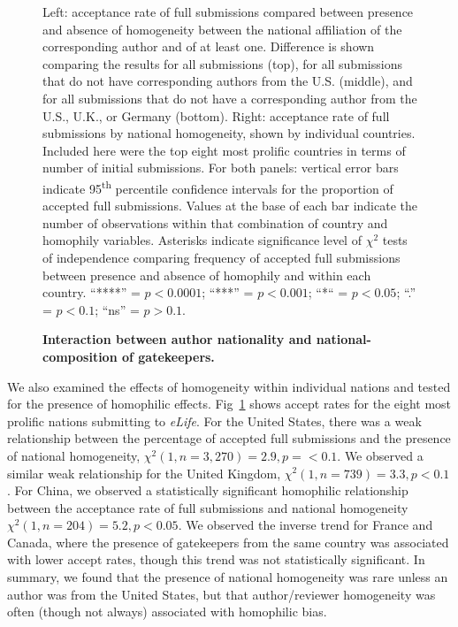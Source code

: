 \documentclass[10pt,letterpaper]{article}
\begin{document}
\begin{figure}[!h]
\caption{\bf Interaction between author nationality and national-composition of gatekeepers.}
Left: acceptance rate of full submissions compared between presence and absence of homogeneity between the national affiliation of the corresponding author and of at least one. Difference is shown comparing the results for all submissions (top), for all submissions that do not have corresponding authors from the U.S. (middle), and for all submissions that do not have a corresponding author from the U.S., U.K., or Germany (bottom). Right: acceptance rate of full submissions by national homogeneity, shown by individual countries. Included here were the top eight most prolific countries in terms of number of initial submissions. For both panels: vertical error bars indicate 95\textsuperscript{th} percentile confidence intervals for the proportion of accepted full submissions. Values at the base of each bar indicate the number of observations within that combination of country and homophily variables. Asterisks indicate significance level of $\chi^{2}$ tests of independence comparing frequency of accepted full submissions between presence and absence of homophily and within each country. “****” = $p < 0.0001$; “***” = $p < 0.001$; “*“ = $p < 0.05$; “.” = $p < 0.1$; “ns” = $p > 0.1$.
\label{fig7}
\end{figure}

We also examined the effects of homogeneity within individual nations and tested for the presence of homophilic effects. Fig~\ref{fig7} shows accept rates for the eight most prolific nations submitting to \textit{eLife}. For the United States, there was a weak relationship between the percentage of accepted full submissions and the presence of national homogeneity, $\chi^{2} (1, n = 3,270) = 2.9, p = < 0.1$. We observed a similar weak relationship for the United Kingdom, $\chi^{2} (1, n = 739) = 3.3, p < 0.1$. For China, we observed a statistically significant homophilic relationship between the acceptance rate of full submissions and national homogeneity $\chi^{2} (1, n = 204) = 5.2, p < 0.05$. We observed the inverse trend for France and Canada, where the presence of gatekeepers from the same country was associated with lower accept rates, though this trend was not statistically significant. In summary, we found that the presence of national homogeneity was rare unless an author was from the United States, but that author/reviewer homogeneity was often (though not always) associated with homophilic bias. 
%
%
\end{document}
